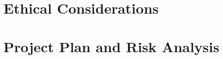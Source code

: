 \documentclass[runningheads]{llncs}
\begin{document}
\section{Ethical Considerations} %

\section{Project Plan and Risk Analysis} %
\end{document}
